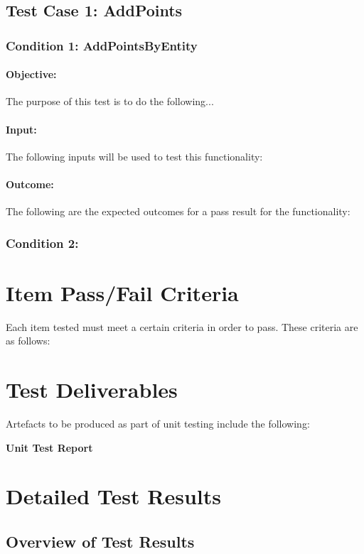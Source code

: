 \documentclass[a4paper,12pt]{article}
\begin{document}
\subsection{Test Case 1: AddPoints}
\subsubsection{Condition 1: AddPointsByEntity}
\paragraph{Objective:}The purpose of this test is to do the following...
\paragraph{Input:}The following inputs will be used to test this functionality:
\paragraph{Outcome: }The following are the expected outcomes for a pass result for the functionality:

\subsubsection{Condition 2:}

\section{Item Pass/Fail Criteria}
Each item tested must meet a certain criteria in order to pass. These criteria are as follows:

\section{Test Deliverables}
Artefacts to be produced as part of unit testing include the following:

\newpage
\begin{center}
{\huge \bfseries Unit Test Report}\\[0.5cm]
\end{center}
\section{Detailed Test Results}
\subsection{Overview of Test Results}
\end{document}
